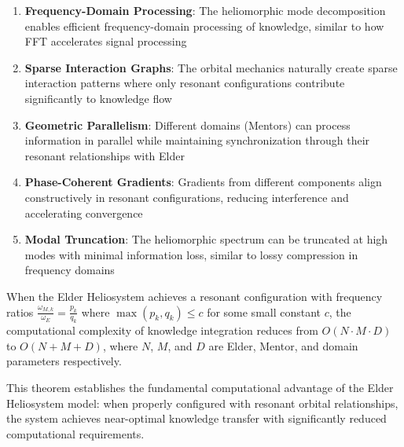 \begin{enumerate}
    \item \textbf{Frequency-Domain Processing}: The heliomorphic mode decomposition enables efficient frequency-domain processing of knowledge, similar to how FFT accelerates signal processing
    
    \item \textbf{Sparse Interaction Graphs}: The orbital mechanics naturally create sparse interaction patterns where only resonant configurations contribute significantly to knowledge flow
    
    \item \textbf{Geometric Parallelism}: Different domains (Mentors) can process information in parallel while maintaining synchronization through their resonant relationships with Elder
    
    \item \textbf{Phase-Coherent Gradients}: Gradients from different components align constructively in resonant configurations, reducing interference and accelerating convergence
    
    \item \textbf{Modal Truncation}: The heliomorphic spectrum can be truncated at high modes with minimal information loss, similar to lossy compression in frequency domains
\end{enumerate}

\begin{theorem}
When the Elder Heliosystem achieves a resonant configuration with frequency ratios $\frac{\omega_{M,k}}{\omega_E} = \frac{p_k}{q_k}$ where $\max(p_k, q_k) \leq c$ for some small constant $c$, the computational complexity of knowledge integration reduces from $O(N \cdot M \cdot D)$ to $O(N + M + D)$, where $N$, $M$, and $D$ are Elder, Mentor, and domain parameters respectively.
\end{theorem}

This theorem establishes the fundamental computational advantage of the Elder Heliosystem model: when properly configured with resonant orbital relationships, the system achieves near-optimal knowledge transfer with significantly reduced computational requirements.

